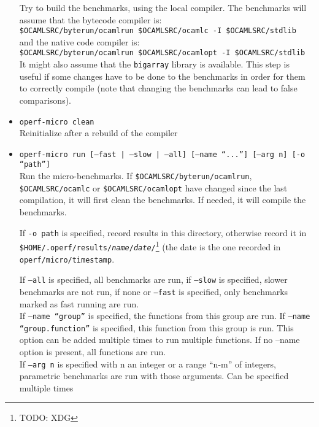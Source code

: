 \documentclass[11pt,a4paper]{article}
\begin{document}
\begin{itemize}
\begin{itemize}
  \end{itemize}
  Try to build the benchmarks, using the local compiler. The benchmarks will
  assume that the bytecode compiler is:\\
  {\tt \$OCAMLSRC/byterun/ocamlrun \$OCAMLSRC/ocamlc -I \$OCAMLSRC/stdlib}\\
  and the native code compiler is:\\
  {\tt \$OCAMLSRC/byterun/ocamlrun \$OCAMLSRC/ocamlopt -I \$OCAMLSRC/stdlib}\\
  It might also assume that the {\tt bigarray} library is available.
  This step is useful if some changes have to be done to the benchmarks in
  order for them to correctly compile (note that changing the benchmarks
  can lead to false comparisons).
\item {\tt operf-micro clean}\\
  Reinitialize after a rebuild of the compiler
\item {\tt operf-micro run [--fast | --slow | --all] [--name ``...'']
  [--arg n] [-o ``path'']}\\
  Run the micro-benchmarks. If {\tt \$OCAMLSRC/byterun/ocamlrun},
  {\tt \$OCAMLSRC/ocamlc} or {\tt \$OCAMLSRC/ocamlopt} have changed since the
  last compilation, it will first clean the benchmarks. If needed, it will
  compile the benchmarks.

  If {\tt -o path} is specified, record results in this directory,
  otherwise record it in {\tt
    \$HOME/.operf/results/{\em name}/{\em date}/}\footnote{TODO: XDG}
  (the date is the one recorded in {\tt operf/micro/timestamp}.

  If {\tt --all} is specified, all benchmarks are run, if {\tt --slow}
  is specified, slower benchmarks are not run, if none or
  {\tt --fast} is specified, only benchmarks marked as fast
  running are run. \\
  If {\tt --name ``group''} is specified, the functions from this
  group are run. If {\tt --name ``group.function''} is specified, this
  function from this group is run. This option can be added multiple
  times to run multiple functions. If no --name option is present, all
  functions are run. \\
  If {\tt --arg n} is specified with n an integer or a range ``n-m'' of
  integers, parametric benchmarks are run with those arguments. Can
  be specified multiple times


\end{itemize}
\end{document}
